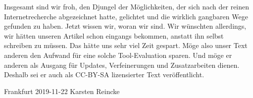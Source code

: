 Insgesamt sind wir froh, den Djungel der Möglichkeiten, der sich nach der reinen
Internetrecherche abgezeichnet hatte, gelichtet und die wirklich gangbaren Wege
gefunden zu haben. Jetzt wissen wir, woran wir sind. Wir wünschten allerdings,
wir hätten unseren Artikel schon eingangs bekommen, anstatt ihn selbst schreiben
zu müssen. Das hätte uns sehr viel Zeit gespart. Möge also unser Text anderen
den Aufwand für eine solche Tool-Evaluation sparen. Und möge er anderen als
Ausgang für Updates, Verfeinerungen und Zusatzarbeiten dienen. Deshalb sei er
auch als CC-BY-SA lizensierter Text veröffentlicht.

Frankfurt 2019-11-22 Karsten Reincke


%
